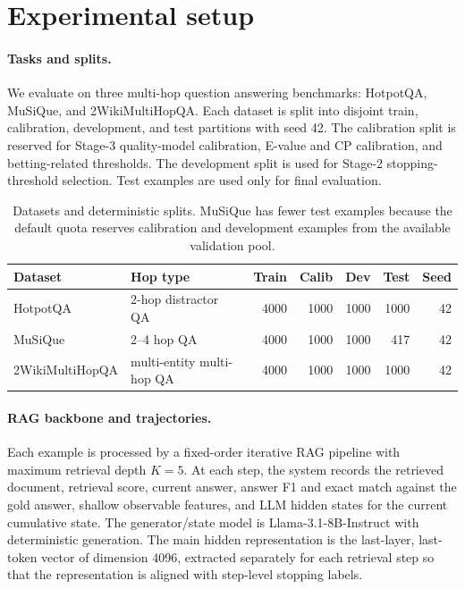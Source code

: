 \documentclass{article}
\newcommand{\hotpot}{HotpotQA}
\newcommand{\musique}{MuSiQue}
\newcommand{\twowiki}{2WikiMultiHopQA}
\begin{document}
\section{Experimental setup}
\label{sec:setup}

\paragraph{Tasks and splits.}
We evaluate on three multi-hop question answering benchmarks: \hotpot{}, \musique{}, and \twowiki{}. Each dataset is split into disjoint train, calibration, development, and test partitions with seed 42. The calibration split is reserved for Stage-3 quality-model calibration, E-value and CP calibration, and betting-related thresholds. The development split is used for Stage-2 stopping-threshold selection. Test examples are used only for final evaluation.

\begin{table}[t]
  \caption{Datasets and deterministic splits. \musique{} has fewer test examples because the default quota reserves calibration and development examples from the available validation pool.}
  \label{tab:splits}
  \centering
  \small
  \begin{tabular}{llrrrrr}
    \toprule
    Dataset & Hop type & Train & Calib & Dev & Test & Seed \\
    \midrule
    \hotpot{} & 2-hop distractor QA & 4000 & 1000 & 1000 & 1000 & 42 \\
    \musique{} & 2--4 hop QA & 4000 & 1000 & 1000 & 417 & 42 \\
    \twowiki{} & multi-entity multi-hop QA & 4000 & 1000 & 1000 & 1000 & 42 \\
    \bottomrule
  \end{tabular}
\end{table}

\paragraph{RAG backbone and trajectories.}
Each example is processed by a fixed-order iterative RAG pipeline with maximum retrieval depth $K=5$. At each step, the system records the retrieved document, retrieval score, current answer, answer F1 and exact match against the gold answer, shallow observable features, and LLM hidden states for the current cumulative state. The generator/state model is Llama-3.1-8B-Instruct with deterministic generation. The main hidden representation is the last-layer, last-token vector of dimension 4096, extracted separately for each retrieval step so that the representation is aligned with step-level stopping labels.
\end{document}
